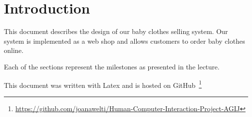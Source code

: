 \section{Introduction}
This document describes the design of our baby clothes selling system. Our system is implemented as a web shop and allows customers to order baby clothes online. 

Each of the sections represent the milestones as presented in the lecture.

This document was written with Latex and is hosted on GitHub~\footnote{\url{https://github.com/joanawelti/Human-Computer-Interaction-Project-AGIJ}}
